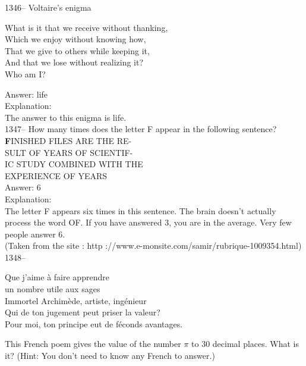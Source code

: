 \documentclass[letterpaper, 12pt]{article}
\begin{document}
1346-- Voltaire's enigma\\
\begin{center}{What is it that we receive without thanking, \\
Which we enjoy without knowing how,\\
That we give to others while keeping it,\\
And that we lose without realizing it?\\
Who am I?\\}
\end{center}

Answer: life\\

Explanation: \\
The answer to this enigma is life.\\

1347-- How many times does the letter F appear in the following sentence?\\

{\Large\textbf FINISHED FILES ARE THE RE-\\
SULT OF YEARS OF SCIENTIF-\\
IC STUDY COMBINED WITH THE \\
EXPERIENCE OF YEARS}\\


Answer: 6\\

Explanation: \\
The letter F appears six times in this sentence. The brain doesn't actually process the word \og OF\fg. If you have answered 3, you are in the average. Very few people answer 6.\\
(Taken from the site : http ://www.e-monsite.com/samir/rubrique-1009354.html)\\

1348-- \begin{center}{Que j'aime \`a faire apprendre\\
un nombre utile aux sages\\
Immortel Archim\`ede, artiste, ing\'enieur\\
Qui de ton jugement peut priser la valeur?\\
Pour moi, ton principe eut de f\'econds avantages.\\}\end{center} This French poem gives the value of the number $\pi$ to 30 decimal places. What is it? (Hint: You don't need to know any French to answer.)\\
\end{document}
